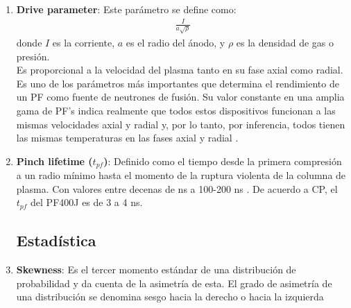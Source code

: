 \begin{enumerate}
\item \textbf{Drive parameter}: Este parámetro se define como:
\begin{align}
{\displaystyle {\frac {I}{a{\sqrt {\rho}}}}}
\end{align}
donde ${\displaystyle I}$ es la corriente, ${\displaystyle a}$ es el radio del ánodo, y ${\displaystyle \rho}$ es la densidad de gas o presión.\\
Es proporcional a la velocidad del plasma tanto en su fase axial como radial. Es uno de los parámetros más importantes que determina el rendimiento de un
PF como fuente de neutrones de fusión. Su valor constante en una amplia gama de PF's indica realmente que todos estos dispositivos funcionan a las mismas velocidades axial y radial y, por lo tanto, por inferencia, todos tienen las mismas temperaturas en las fases axial y radial \cite{Zhang2006} .
\item \textbf{Pinch lifetime ($t_{pf}$)}: Definido como el tiempo desde la primera compresión a un radio mínimo hasta el momento de la ruptura violenta de la columna de plasma. Con valores entre decenas de ns a 100-200 ns \cite{SingLee1996}. De acuerdo a CP, el $t_{pf}$ del PF400J es de 3 a 4 ns.
\subsection{Estadística}
\item \textbf{Skewness}: Es el tercer momento estándar de una distribución de probabilidad y da cuenta de la asimetría de esta. El grado de asimetría de una distribución se denomina sesgo hacia la derecho o hacia la izquierda




\end{enumerate}
